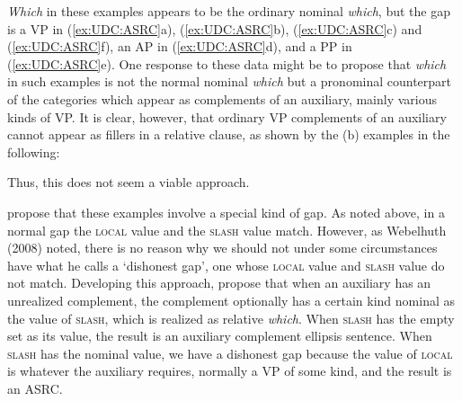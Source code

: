 \documentclass[output=paper
                ,modfonts
                ,nonflat
	        ,collection
	        ,collectionchapter
	        ,collectiontoclongg
 	        ,biblatex
                ,babelshorthands
                ,newtxmath
                ,draftmode
                ,colorlinks, citecolor=brown
]{./langsci/langscibook}
\begin{document}
{\noindent
\emph{Which} in these examples appears to be the ordinary nominal
\emph{which}, but the gap is a VP in (\ref{ex:UDC:ASRC}a), (\ref{ex:UDC:ASRC}b), (\ref{ex:UDC:ASRC}c) and (\ref{ex:UDC:ASRC}f), an AP in
(\ref{ex:UDC:ASRC}d), and a PP in (\ref{ex:UDC:ASRC}e). One response to these data might be to propose
that \emph{which} in such examples is not the normal nominal
\emph{which} but a pronominal counterpart of the categories which appear
as complements of an auxiliary, mainly various kinds of VP. It is clear,
however, that ordinary VP complements of an auxiliary cannot appear as
fillers in a relative clause, as shown by the (b) examples in the
following:

\begin{exe} \ex \begin{xlist} 

\end{xlist}
\end{exe}

\begin{exe} \ex \begin{xlist} 

\end{xlist}
\end{exe}
\noindent
\begin{exe} \ex \begin{xlist} 

\end{xlist}
\end{exe}

\noindent
Thus, this does not seem a viable approach.

\citet{Arnold:Borsley:10} propose that these examples involve a special
kind of gap. As noted above, in a normal gap the \textsc{local} value and the
\textsc{slash} value match. However, as Webelhuth (2008) noted, there is no
reason why we should not under some circumstances have what he calls a
`dishonest gap', one whose \textsc{local} value and \textsc{slash} value do not match.
Developing this approach, \citet{Arnold:Borsley:10} propose that when an
auxiliary has an unrealized complement, the complement optionally has a
certain kind nominal as the value of \textsc{slash}, which is realized as
relative \emph{which}. When \textsc{slash} has the empty set as its value, the
result is an auxiliary complement ellipsis sentence. When \textsc{slash} has the
nominal value, we have a dishonest gap because the value of \textsc{local} is
whatever the auxiliary requires, normally a VP of some kind, and the
result is an ASRC.

}
\end{document}
